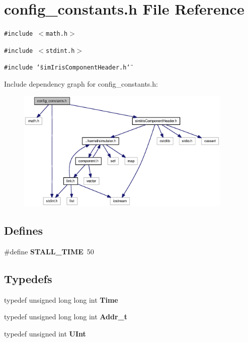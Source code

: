 \section{config\_\-constants.h File Reference}
\label{config__constants_8h}
{\tt \#include $<$math.h$>$}\par
{\tt \#include $<$stdint.h$>$}\par
{\tt \#include \char`\"{}simIrisComponentHeader.h\char`\"{}}\par


Include dependency graph for config\_\-constants.h:\nopagebreak
\begin{figure}[H]
\begin{center}
\leavevmode
\includegraphics[width=292pt]{config__constants_8h__incl}
\end{center}
\end{figure}
\subsection*{Defines}
\begin{CompactItemize}
\item 
\#define {\bf STALL\_\-TIME}~50
\end{CompactItemize}
\subsection*{Typedefs}
\begin{CompactItemize}
\item 
typedef unsigned long long int {\bf Time}
\item 
typedef unsigned long long int {\bf Addr\_\-t}
\item 
typedef unsigned int {\bf UInt}
\end{CompactItemize}
